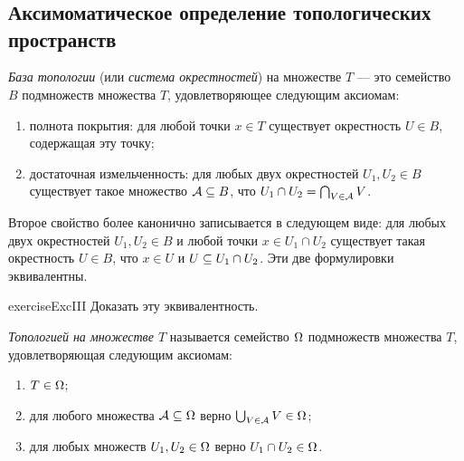 \documentclass[main]{subfiles}
\begin{document}

\section{}

\subsection{Аксимоматическое определение топологических пространств}

\begin{definition}
	\emph{База топологии} (или \emph{система окрестностей}) на множестве $ T $ --- это семейство $ B $ подмножеств
	множества $ T $, удовлетворяющее следующим аксиомам:
	\begin{enumerate}
		\item полнота покрытия: для любой точки $ x \in T $ существует окрестность $ U \in B $, содержащая эту точку;
		\item достаточная измельченность: для любых двух окрестностей $ U_1, U_2 \in B $ существует такое множество
			$\mathcal{A} \subseteq B $, что $ U_1 \cap U_2 = \bigcap_{V \in \mathcal{A}} V $.
	\end{enumerate}
\end{definition}

\begin{remark}
	Второе свойство более канонично записывается в следующем виде: для любых двух окрестностей $ U_1, U_2 \in B $ и
	любой точки $ x \in U_1 \cap U_2 $ существует такая окрестность $ U \in B $, что $ x \in U $ и
	$ U \subseteq U_1 \cap U_2 $. Эти две формулировки эквивалентны.
\end{remark}

\begin{restatable}{exercise}{ExcIII}
	Доказать эту эквивалентность.
\end{restatable}

\begin{definition}
	\emph{Топологией на множестве $ T $} называется семейство $ \Omega $ подмножеств множества $ T $,
	удовлетворяющая следующим аксиомам:
	\begin{enumerate}
		\item $ T \in \Omega $;
		\item для любого множества $ \mathcal{A} \subseteq \Omega $ верно $ \bigcup_{V \in \mathcal{A}} V \in \Omega $;
		\item для любых множеств $ U_1, U_2 \in \Omega $ верно $ U_1 \cap U_2 \in \Omega $.
	\end{enumerate}
\end{definition}
\end{document}
